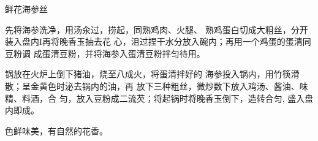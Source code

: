 \begin{recipe}{鲜花海参丝}

\ingredients



\cooking

\step 	先将海参洗净，用汤汆过，捞起，同熟鸡肉、火腿、 熟鸡蛋白切成大粗丝，分开装入盘内I再将晚香玉抽去花 心，沮过捏干水分放入碗内；再用一个鸡蛋的蛋清同豆粉调 成蛋清豆粉，并将海参入蛋清豆粉拌匀待用。

\step 	锅放在火炉上倒下猪油，烧至八成火，将蛋清拌好的 海参投入锅内，用竹筷滑散；呈金黄色时泌去锅内的油，再 放下三种粗丝，微炒数下放入鸡汤、酱油、味精、料酒，合 匀，放入豆粉成二流芡；将起锅时将晚香玉倒下，造转合匀, 盛入盘内即成。

\notes

色鲜味美，有自然的花香。

\end{recipe}

